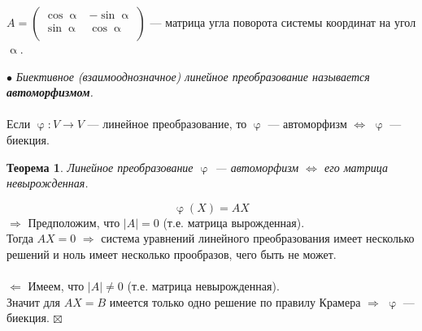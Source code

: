 \documentclass[a4paper, 12pt]{article}
\newtheorem*{theorem}{Теорема}
\newenvironment{Proof}
{\par\noindent{$\blacklozenge$}}
{\hfill$\scriptstyle\boxtimes$}
\renewcommand{\alpha}{\upalpha}
\renewcommand{\varphi}{\upvarphi}
\begin{document}
\begin{center}
    $A = \begin{pmatrix}
    \cos \alpha & -\sin \alpha\\
    \sin \alpha & \cos \alpha\\
    \end{pmatrix}$
    --- матрица угла поворота системы координат на угол $\alpha$.\\
    \end{center}
    $\bullet$ \textit{Биективное (взаимооднозначное) линейное преобразование называется \textbf{автоморфизмом}.}\\\\
    Если $\varphi: V \rightarrow V$ --- линейное преобразование, то $\varphi$ --- автоморфизм $\Leftrightarrow$ $\varphi$ --- биекция.
    \begin{theorem}
        Линейное преобразование $\varphi$ --- автоморфизм $\Leftrightarrow$ его матрица невырожденная.
    \end{theorem}
    \begin{Proof}
    $$\varphi(X)=AX$$
    $\Rightarrow$ Предположим, что $|A| = 0$ (т.е. матрица вырожденная).\\
    Тогда $AX=0$ $\Rightarrow$ система уравнений линейного преобразования имеет несколько решений и ноль имеет несколько прообразов, чего быть не может.\\\\
    $\Leftarrow$ Имеем, что $|A| \neq 0$ (т.е. матрица невырожденная).\\
    Значит для $AX=B$ имеется только одно решение по правилу Крамера $\Rightarrow$ $\varphi$ --- биекция.
    \end{Proof}
\end{document}
